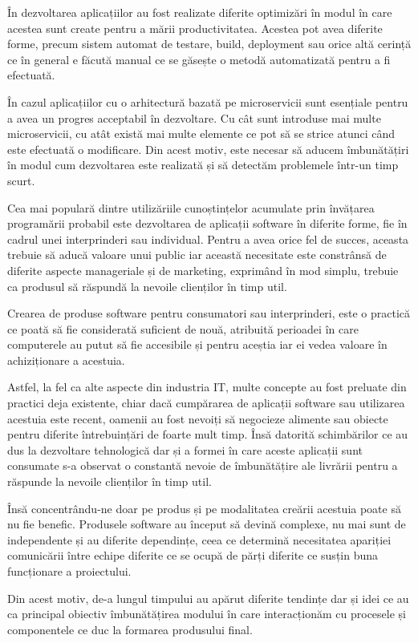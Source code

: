În dezvoltarea aplicațiilor au fost realizate diferite optimizări în modul în care acestea
sunt create pentru a mării productivitatea. Acestea pot avea diferite forme,
precum sistem automat de testare, build, deployment sau orice altă cerință ce
în general e făcută manual ce se găsește o metodă automatizată pentru a fi efectuată.

În cazul aplicațiilor cu o arhitectură bazată pe microservicii sunt esențiale
pentru a avea un progres acceptabil în dezvoltare. Cu cât sunt introduse mai multe
microservicii, cu atât există mai multe elemente ce pot să se strice atunci când este
efectuată o modificare. Din acest motiv, este necesar să aducem îmbunătățiri în
modul cum dezvoltarea este realizată și să detectăm problemele într-un timp scurt.

Cea mai populară dintre utilizăriile cunoștințelor acumulate prin învățarea 
programării probabil este dezvoltarea de aplicații software în diferite forme, 
fie în cadrul unei interprinderi sau individual. Pentru a avea orice fel de succes,
aceasta trebuie să aducă valoare unui public iar această necesitate este constrânsă
de diferite aspecte manageriale și de marketing, exprimând în mod simplu, trebuie
ca produsul să răspundă la nevoile clienților în timp util.

Crearea de produse software pentru consumatori sau interprinderi, este o practică ce 
poată să fie considerată suficient de nouă, atribuită perioadei în care computerele 
au putut să fie accesibile și pentru aceștia iar ei vedea valoare în achiziționare 
a acestuia.

Astfel, la fel ca alte aspecte din industria IT, multe concepte au fost preluate
din practici deja existente, chiar dacă cumpărarea de aplicații software sau utilizarea
acestuia este recent, oamenii au fost nevoiți să negocieze alimente sau obiecte
pentru diferite întrebuințări de foarte mult timp. Însă datorită schimbărilor
ce au dus la dezvoltare tehnologică dar și a formei în care aceste aplicații sunt consumate
s-a observat o constantă nevoie de îmbunătățire ale livrării pentru a 
răspunde la nevoile clienților în timp util.

Însă concentrându-ne doar pe produs și pe modalitatea creării acestuia poate să
nu fie benefic. Produsele software au început să devină complexe, nu mai sunt
de independente și au diferite dependințe, ceea ce determină necesitatea apariției
comunicării între echipe diferite ce se ocupă de părți diferite ce susțin
buna funcționare a proiectului.

Din acest motiv, de-a lungul timpului au apărut diferite tendințe dar și idei 
ce au ca principal obiectiv îmbunătățirea modului în care interacționăm cu procesele
și componentele ce duc la formarea produsului final. 